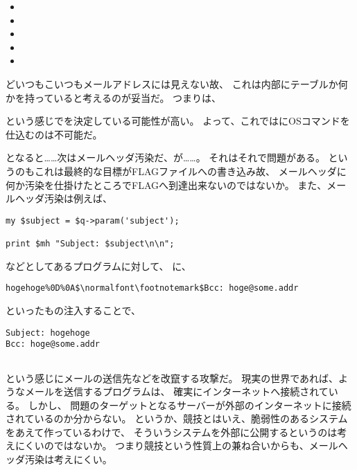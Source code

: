 \begin{itemize}
	\item {}
	\item {}
	\item {}
	\item {}
	\item {}
\end{itemize}

どいつもこいつもメールアドレスには見えない故、
これは内部にテーブルか何かを持っていると考えるのが妥当だ。
つまりは、



という感じでを決定している可能性が高い。
よって、これではにOSコマンドを仕込むのは不可能だ。

となると……次はメールヘッダ汚染だ、が……。
それはそれで問題がある。
というのもこれは最終的な目標がFLAGファイルへの書き込み故、
メールヘッダに何か汚染を仕掛けたところでFLAGへ到達出来ないのではないか。
また、メールヘッダ汚染は例えば、

\begin{lstlisting}[style=perl]
my $subject = $q->param('subject');

print $mh "Subject: $subject\n\n";
\end{lstlisting}

などとしてあるプログラムに対して、
に、

\begin{lstlisting}[mathescape]
hogehoge%0D%0A$\normalfont\footnotemark$Bcc: hoge@some.addr
\end{lstlisting}

といったもの注入することで、

\begin{lstlisting}
Subject: hogehoge
Bcc: hoge@some.addr


\end{lstlisting}

という感じにメールの送信先などを改竄する攻撃だ。
現実の世界であれば、ようなメールを送信するプログラムは、
確実にインターネットへ接続されている。
しかし、
問題のターゲットとなるサーバーが外部のインターネットに接続されているのか分からない。
というか、競技とはいえ、脆弱性のあるシステムをあえて作っているわけで、
そういうシステムを外部に公開するというのは考えにくいのではないか。
つまり競技という性質上の兼ね合いからも、メールヘッダ汚染は考えにくい。


